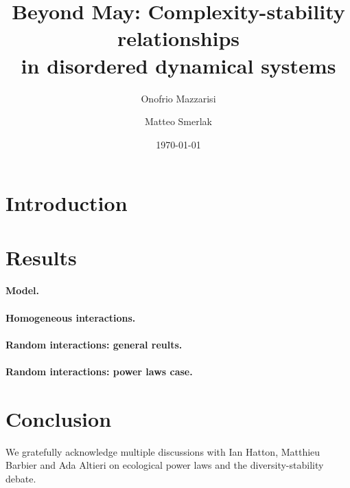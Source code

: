 \documentclass[
 prl,
 twocolumn,
 amsmath,
 amssymb,
 aps,
]{revtex4-2}
\begin{document}
\title{Beyond May: Complexity-stability relationships \\
in disordered dynamical systems}

\author{Onofrio Mazzarisi}

\author{Matteo Smerlak}


\date{\today}%

\begin{abstract}


\end{abstract}
\maketitle

\section*{Introduction}


\section*{Results}

\paragraph*{\bf Model.}


\paragraph*{\bf Homogeneous interactions.}


\paragraph*{\bf Random interactions: general reults.}

\paragraph*{\bf Random interactions: power laws case.}

    

\section{Conclusion}


\begin{acknowledgments}
We gratefully acknowledge multiple discussions with Ian Hatton, Matthieu Barbier and Ada Altieri on ecological power laws and the diversity-stability debate. 
\end{acknowledgments}

\clearpage



\end{document}

